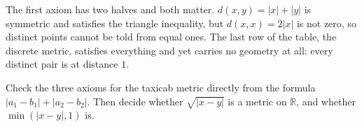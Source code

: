 \documentclass[10pt]{article}
\newcommand{\R}{\mathbb{R}}
\begin{document}
{\begin{minipage}[t]{744pt}
\begin{minipage}[t]{358pt}
\begin{pitfall}
The first axiom has two halves and both matter. $d(x,y)=|x|+|y|$ is symmetric and satisfies the triangle inequality, but $d(x,x)=2|x|$ is not zero, so distinct points cannot be told from equal ones. The last row of the table, the discrete metric, satisfies everything and yet carries no geometry at all: every distinct pair is at distance $1$.
\end{pitfall}
\begin{tryit}
Check the three axioms for the taxicab metric directly from the formula $|a_1-b_1|+|a_2-b_2|$. Then decide whether $\sqrt{|x-y|}$ is a metric on $\R$, and whether $\min(|x-y|,1)$ is.
\end{tryit}
\end{minipage}
\end{minipage}
}

\end{document}
